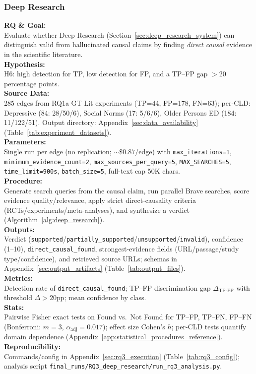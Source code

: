 \subsubsection{Deep Research}\label{sec:rq3_deep_research}
\noindent\textbf{RQ \& Goal:}\\
Evaluate whether Deep Research (Section~\ref{sec:deep_research_system}) can distinguish valid from hallucinated causal claims by finding \emph{direct causal} evidence in the scientific literature.\\
\textbf{Hypothesis:}\\
H6: high detection for TP, low detection for FP, and a TP--FP gap $>$20 percentage points.\\
\textbf{Source Data:}\\
285 edges from RQ1a GT Lit experiments (TP=44, FP=178, FN=63); per-CLD: Depressive (84: 28/50/6), Social Norms (17: 5/6/6), Older Persons ED (184: 11/122/51). Output directory: Appendix~\ref{sec:data_availability} (Table~\ref{tab:experiment_datasets}).\\
\textbf{Parameters:}\\
Single run per edge (no replication; $\sim\$0.87$/edge) with \texttt{max\_iterations=1}, \texttt{minimum\_evidence\_count=2}, \texttt{max\_sources\_per\_query=5}, \texttt{MAX\_SEARCHES=5}, \texttt{time\_limit=900s}, \texttt{batch\_size=5}, full-text cap 50K chars.\\
\textbf{Procedure:}\\
Generate search queries from the causal claim, run parallel Brave searches, score evidence quality/relevance, apply strict direct-causality criteria (RCTs/experiments/meta-analyses), and synthesize a verdict (Algorithm~\ref{alg:deep_research}).\\
\textbf{Outputs:}\\
Verdict (\texttt{supported}/\texttt{partially\_supported}/\texttt{unsupported}/\texttt{invalid}), confidence (1--10), \texttt{direct\_causal\_found}, strongest-evidence fields (URL/passage/study type/confidence), and retrieved source URLs; schemas in Appendix~\ref{sec:output_artifacts} (Table~\ref{tab:output_files}).\\
\textbf{Metrics:}\\
Detection rate of \texttt{direct\_causal\_found}; TP--FP discrimination gap \(\Delta_{\text{TP-FP}}\) with threshold \(\Delta>20\)pp; mean confidence by class.\\
\textbf{Stats:}\\
Pairwise Fisher exact tests on Found vs.\ Not Found for TP--FP, TP--FN, FP--FN (Bonferroni: $m=3$, $\alpha_{\text{adj}}=0.017$); effect size Cohen's $h$; per-CLD tests quantify domain dependence (Appendix~\ref{app:statistical_procedures_reference}).\\
\textbf{Reproducibility:}\\
Commands/config in Appendix~\ref{sec:rq3_execution} (Table~\ref{tab:rq3_config}); analysis script \texttt{final\_runs/RQ3\_deep\_research/run\_rq3\_analysis.py}.

